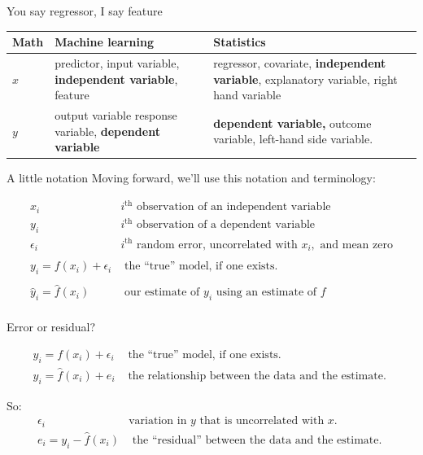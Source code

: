 \documentclass[aspectratio=169]{beamer}
\begin{document}
\begin{frame}{You say regressor, I say feature}

\begin{table}[]
\begin{tabular}{lp{5cm}p{5cm}}
 \textbf{Math} & \textbf{Machine learning} & \textbf{Statistics}  \\
 \hline
 \hline
  $x$& predictor, input variable, \textbf{independent variable}, feature & regressor, covariate, \textbf{independent variable}, explanatory variable, right hand variable \\
 $y$ &  output variable response variable, \textbf{dependent variable} & \textbf{dependent variable,} outcome variable, left-hand side variable.
\end{tabular}
\end{table}

\end{frame}


\begin{frame}{A little notation}
Moving forward, we'll use this notation and terminology:

\begin{eqnarray*}
x_i & i^\text{th} \text{ observation of an independent variable}\\
y_i & i^\text{th} \text{ observation of a dependent variable}\\
\epsilon_i & i^\text{th} \text{ random error, uncorrelated with }x_i,\text{ and mean zero}\\\\
y_i = f(x_i) + \epsilon_i & \text{ the ``true'' model, if one exists. }\\\\
\hat{y}_i = \hat{f}(x_i)  & \text{ our estimate of }y_i\text{ using an estimate of }f\\\end{eqnarray*}
\end{frame}

\begin{frame}{Error or residual?}

\begin{eqnarray*}
y_i = f(x_i) + \epsilon_i & \text{ the ``true'' model, if one exists. }\\
y_i = \hat{f}(x_i) + e_i & \text{ the relationship between the data and the estimate. }
\end{eqnarray*}

\hspace{5mm}
\pause

So:
\begin{eqnarray*}
\epsilon_i&\text{variation in $y$ that is uncorrelated with $x$.}\\
e_i = y_i - \hat{f}(x_i) & \text{ the ``residual'' between the data and the estimate. }
\end{eqnarray*}

\end{frame}
\end{document}
